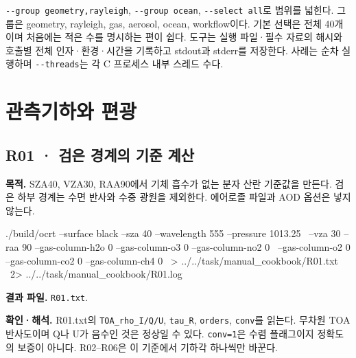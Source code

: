 \texttt{-\allowbreak{}-\allowbreak{}group geometry,rayleigh}, \texttt{-\allowbreak{}-\allowbreak{}group ocean}, \texttt{-\allowbreak{}-\allowbreak{}select all}로 범위를 넓힌다. 그룹은 geometry, rayleigh, gas, aerosol, ocean, workflow이다. 기본 선택은 전체 40개이며 처음에는 적은 수를 명시하는 편이 쉽다. 도구는 실행 파일·필수 자료의 해시와 호출별 전체 인자·환경·시간을 기록하고 stdout과 stderr를 저장한다. 사례는 순차 실행하며 \texttt{-\allowbreak{}-\allowbreak{}threads}는 각 C 프로세스 내부 스레드 수다.

\section{관측기하와 편광}
\label{sec:auto:09_cookbook:2}


\subsection{R01 · 검은 경계의 기준 계산}
\label{sec:auto:09_cookbook:2.1}

\label{recipe:R01}

\textbf{목적. }SZA40\textdegree{}, VZA30\textdegree{}, RAA90\textdegree{}에서 기체 흡수가 없는 분자 산란 기준값을 만든다. 검은 하부 경계는 수면 반사와 수중 광원을 제외한다. 에어로졸 파일과 AOD 옵션은 넣지 않는다.

\noindent\begin{minipage}{\linewidth}
\begin{ManualCode}

./build/ocrt --surface black --sza 40 --wavelength 555 --pressure 1013.25 \
  --vza 30 --raa 90 --gas-column-h2o 0 --gas-column-o3 0 --gas-column-no2 0 \
  --gas-column-o2 0 --gas-column-co2 0 --gas-column-ch4 0 \
  > ../../task/manual_cookbook/R01.txt \
  2> ../../task/manual_cookbook/R01.log

\end{ManualCode}
\end{minipage}\par

\textbf{결과 파일. }\texttt{R01.txt}.

\textbf{확인·해석. }R01.txt의 \texttt{TOA\_\allowbreak{}rho\_\allowbreak{}I/\allowbreak{}Q/\allowbreak{}U}, \texttt{tau\_\allowbreak{}R}, \texttt{orders}, \texttt{conv}를 읽는다. 무차원 TOA 반사도이며 Q나 U가 음수인 것은 정상일 수 있다. \texttt{conv=\allowbreak{}1}은 수렴 플래그이지 정확도의 보증이 아니다. R02–R06은 이 기준에서 기하각 하나씩만 바꾼다.

